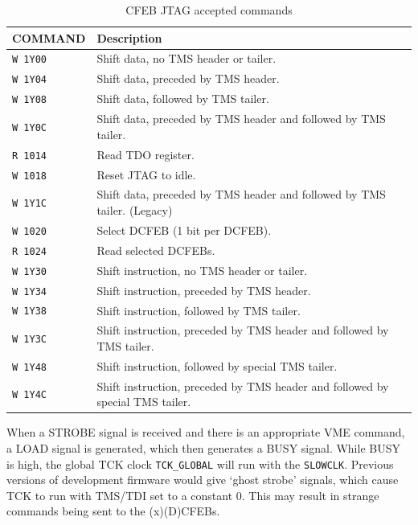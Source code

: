 \documentclass[10pt,a4paper]{article}
\begin{document}
\begin{table}[H]
\begin{tabular}{|l|l|} \hline
COMMAND& Description\\ \hline
\texttt{W 1Y00}& Shift data, no TMS header or tailer.\\ \hline
\texttt{W 1Y04}& Shift data, preceded by TMS header.\\ \hline
\texttt{W 1Y08}& Shift data, followed by TMS tailer.\\ \hline
\texttt{W 1Y0C}& Shift data, preceded by TMS header and followed by TMS tailer.\\ \hline
\texttt{R 1014}& Read TDO register.\\ \hline
\texttt{W 1018}& Reset JTAG to idle.\\ \hline
\texttt{W 1Y1C}& Shift data, preceded by TMS header and followed by TMS tailer. (Legacy)\\ \hline
\texttt{W 1020}& Select DCFEB (1 bit per DCFEB).\\ \hline
\texttt{R 1024}& Read selected DCFEBs.\\ \hline
\texttt{W 1Y30}& Shift instruction, no TMS header or tailer.\\ \hline
\texttt{W 1Y34}& Shift instruction, preceded by TMS header.\\ \hline
\texttt{W 1Y38}& Shift instruction, followed by TMS tailer.\\ \hline
\texttt{W 1Y3C}& Shift instruction, preceded by TMS header and followed by TMS tailer.\\ \hline
\texttt{W 1Y48}& Shift instruction, followed by special TMS tailer.\\ \hline
\texttt{W 1Y4C}& Shift instruction, preceded by TMS header and followed by special TMS tailer.\\ \hline
\end{tabular}
\caption{CFEB JTAG accepted commands}
\label{tab:cfebjtagcommands}
\end{table}

When a STROBE signal is received and there is an appropriate VME command, a LOAD signal is generated, which then generates a BUSY signal. While BUSY is high, the global TCK clock \texttt{TCK\_GLOBAL} will run with the \texttt{SLOWCLK}. Previous versions of development firmware would give `ghost strobe' signals, which cause TCK to run with TMS/TDI set to a constant 0. This may result in strange commands being sent to the (x)(D)CFEBs.
\end{document}
